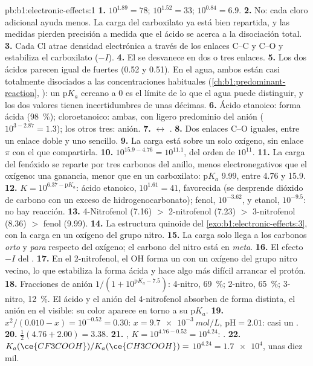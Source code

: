 \begin{solution}{pb:b1:electronic-effects:1}
\textbf{1.} $10^{1.89} = 78$; $10^{1.52} = 33$; $10^{0.84} = 6.9$.
\textbf{2.} No: cada cloro adicional ayuda menos. La carga del carboxilato
ya está bien repartida, y las medidas pierden precisión a medida que el
ácido se acerca a la disociación total.
\textbf{3.} Cada Cl atrae densidad electrónica a través de los enlaces
C--C y C--O y estabiliza el carboxilato ($-I$).
\textbf{4.} El  se desvanece en dos o tres enlaces.
\textbf{5.} Los dos ácidos parecen igual de fuertes (0.52 y 0.51). En el
agua, ambos están casi totalmente disociados a las concentraciones
habituales (\cref{ch:b1:predominant-reaction}, ): un
$\mathrm{p}K_a$ cercano a 0 es el límite de lo que el agua puede
distinguir, y los dos valores tienen incertidumbres de unas décimas.
\textbf{6.} Ácido etanoico: forma ácida (\qty{98}{\percent});
cloroetanoico: ambas, con ligero predominio del anión
($10^{3 - 2.87} = 1.3$); los otros tres: anión.
\textbf{7.}  $\leftrightarrow$ .
\textbf{8.} Dos enlaces C--O iguales, entre un enlace doble y uno sencillo.
\textbf{9.} La carga está sobre un solo oxígeno, sin enlace $\pi$ con el
que compartirla.
\textbf{10.} $10^{15.9 - 4.76} = 10^{11.1}$, del orden de $10^{11}$.
\textbf{11.} La carga del fenóxido se reparte por tres carbonos del
anillo, menos electronegativos que el oxígeno: una ganancia, menor que en
un carboxilato: $\mathrm{p}K_a$ 9.99, entre 4.76 y 15.9.
\textbf{12.} $K = 10^{6.37 - \mathrm{p}K_a}$: ácido etanoico,
$10^{1.61} = 41$, favorecida (se desprende dióxido de carbono con un
exceso de hidrogenocarbonato); fenol, $10^{-3.62}$, y etanol,
$10^{-9.5}$: no hay reacción.
\textbf{13.} 4-Nitrofenol (7.16) $>$ 2-nitrofenol (7.23) $>$
3-nitrofenol (8.36) $>$ fenol (9.99).
\textbf{14.} La estructura quinoide del
\cref{exo:b1:electronic-effects:3}, con la carga en un oxígeno del grupo
nitro.
\textbf{15.} La carga solo llega a los carbonos \textit{orto} y
\textit{para} respecto del oxígeno; el carbono del nitro está en
\textit{meta}.
\textbf{16.} El efecto $-I$ del .
\textbf{17.} En el 2-nitrofenol, el OH forma un  con
un oxígeno del grupo nitro vecino, lo que estabiliza la forma ácida y
hace algo más difícil arrancar el protón.
\textbf{18.} Fracciones de anión $1/(1 + 10^{\mathrm{p}K_a - 7.5})$:
4-nitro, \qty{69}{\percent}; 2-nitro, \qty{65}{\percent}; 3-nitro,
\qty{12}{\percent}. El ácido y el anión del 4-nitrofenol absorben de
forma distinta, el anión en el visible: su color aparece en torno a su
$\mathrm{p}K_a$.
\textbf{19.} $x^2/(0.010 - x) = 10^{-0.52} = 0.30$: $x = \qty{9.7e-3}{mol/L}$,
$\mathrm{pH} = 2.01$: casi un .
\textbf{20.} $\frac12(4.76 + 2.00) = 3.38$.
\textbf{21.} , $K = 10^{4.76 -
0.52} = 10^{4.24}$: .
\textbf{22.} $K_a(\ce{CF3COOH})/K_a(\ce{CH3COOH}) =$ \textbf{$10^{4.24} =
\num{1.7e4}$}, unas diez mil.
\end{solution}
